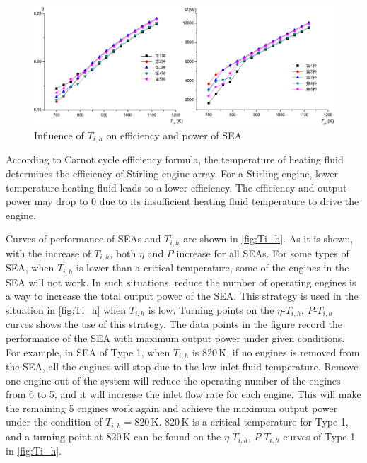 \begin{figure}[htpb]
\centering
	\includegraphics[width = 0.9\columnwidth]{fig/T_ih}
	\caption{Influence of $T_{i,h}$ on efficiency and power of SEA}
	\label{fig:Ti_h}
\end{figure}
According to Carnot cycle efficiency formula, the temperature of heating fluid determines the efficiency of Stirling engine array. For a Stirling engine, lower temperature heating fluid leads to a lower efficiency. The efficiency and output power may drop to 0 due to its insufficient heating fluid temperature to drive the engine.

Curves of performance of SEAs and $T_{i,h}$ are shown in \autoref{fig:Ti_h}.
As it is shown, with the increase of $T_{i,h}$, both $\eta$ and $P$ increase for all SEAs. For some types of SEA, when $T_{i,h}$ is lower than a critical temperature, some of the engines in the SEA will not work. In such situations, reduce the number of operating engines is a way to increase the total output power of the SEA. This strategy is used in the situation in \autoref{fig:Ti_h} when $T_{i,h}$ is low. Turning points on the $\eta$-$T_{i,h}$, $P$-$T_{i,h}$ curves shows the use of this strategy. The data points in the figure record the performance of the SEA with maximum output power under given conditions. 
For example, in SEA of Type 1, when $T_{i,h}$ is  820\,K, if no engines is removed from the SEA, all the engines will stop due to the low inlet fluid temperature. Remove one engine out of the system will reduce the operating number of the engines from 6 to 5, and it will increase the inlet flow rate for each engine. This will make the remaining 5 engines work again and achieve the maximum output power under the condition of $T_{i,h} = 820\,\mathrm{K}$. $820\,\mathrm{K}$ is a critical temperature for Type 1, and a turning point at 820\,K can be found on the $\eta$-$T_{i,h}$, $P$-$T_{i,h}$ curves of Type 1 in \autoref{fig:Ti_h}. 

